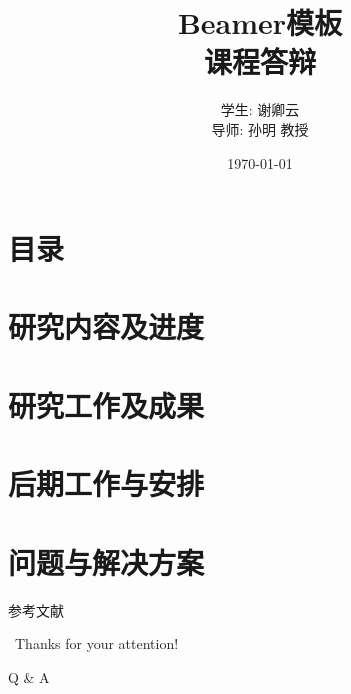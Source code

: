 \documentclass{beamer}
\title[关于使用电子科技大学Beamer模板的使用研究报告]{Beamer模板\\[2mm] 课程答辩}
\author[Kytolly]{学生: 谢卿云\\[5mm] 导师: 孙明 教授}
\institute[电子科技大学]{\small  电子科技大学}
\date{\small \vskip -10pt \today}
\begin{document}
\begin{frame}
	\maketitle
\end{frame}

\section*{目录}
\frame{
  \frametitle{\secname}
  \tableofcontents[hideallsubsections]
}

\section{研究内容及进度}


\section{研究工作及成果}


\section{后期工作与安排}


\section{问题与解决方案}



\begin{frame}[allowframebreaks]{参考文献}
  
  
\end{frame}

\begin{frame}
	\begin{center}
    {\Huge\calligra\ Thanks for your attention!}
    \vspace{1cm}

    {\Huge Q \& A}
  \end{center}
\end{frame}

\end{document}
